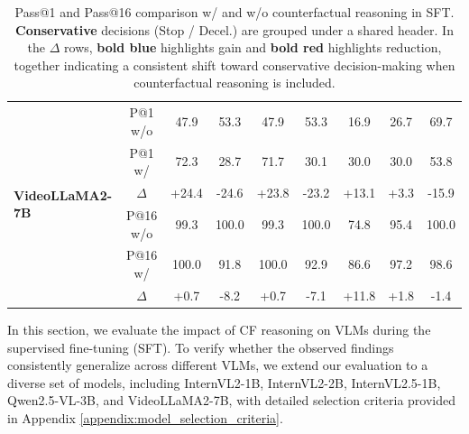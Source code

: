 \documentclass{article}
\begin{document}
\begin{table}[h]
{\begin{tabular}{l c | cc cc | ccc}
\multirow{6}{*}{\textbf{VideoLLaMA2-7B}}
 & P@1 w/o & 47.9 & 53.3 & 47.9 & 53.3 & 16.9 & 26.7 & 69.7 \\
 & P@1 w/  & 72.3 & 28.7 & 71.7 & 30.1 & 30.0 & 30.0 & 53.8 \\
 & $\Delta$
   & \cellcolor{blue!15}+24.4 & \cellcolor{red!15}-24.6
   & \cellcolor{blue!15}+23.8 & \cellcolor{red!15}-23.2
   & \cellcolor{blue!15}+13.1 & \cellcolor{blue!15}+3.3
   & \cellcolor{red!15}-15.9 \\
\cmidrule{2-9}
 & P@16 w/o & 99.3 & 100.0 & 99.3 & 100.0 & 74.8 & 95.4 & 100.0 \\
 & P@16 w/  & 100.0 & 91.8 & 100.0 & 92.9 & 86.6 & 97.2 & 98.6 \\
 & $\Delta$
   & \cellcolor{blue!15}+0.7  & \cellcolor{red!15}-8.2
   & \cellcolor{blue!15}+0.7  & \cellcolor{red!15}-7.1
   & \cellcolor{blue!15}+11.8 & \cellcolor{blue!15}+1.8
   & \cellcolor{red!15}-1.4 \\
\bottomrule
\end{tabular}
}
\caption{
  Pass@1 and Pass@16 comparison w/ and w/o counterfactual reasoning in SFT.
  \textbf{Conservative} decisions (Stop / Decel.) are grouped under a shared header.
  In the $\Delta$ rows, \colorbox{blue!15}{\textbf{bold blue}} highlights gain
  and \colorbox{red!15}{\textbf{bold red}} highlights reduction,
  together indicating a consistent shift toward conservative decision-making
  when counterfactual reasoning is included.
}
\label{tab:passk_sft}
\end{table}


In this section, we evaluate the impact of CF reasoning on VLMs during the supervised fine-tuning (SFT). To verify whether the observed findings consistently generalize across different VLMs, we extend our evaluation to a diverse set of models, including InternVL2-1B, InternVL2-2B, InternVL2.5-1B, Qwen2.5-VL-3B, and VideoLLaMA2-7B, with detailed selection criteria provided in Appendix \ref{appendix:model_selection_criteria}.

\end{document}
